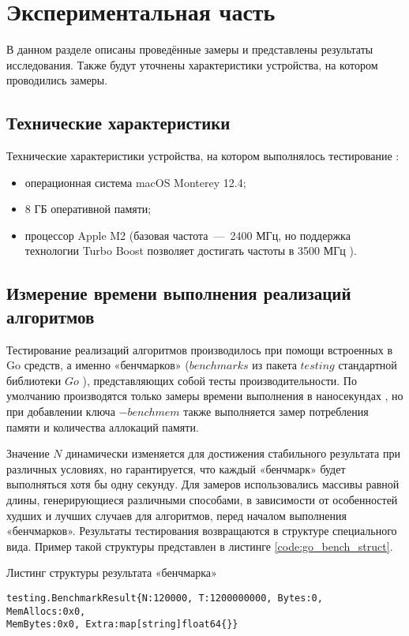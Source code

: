 \chapter{Экспериментальная часть}

В данном разделе описаны проведённые замеры и представлены результаты исследования. Также будут уточнены характеристики устройства, на котором проводились замеры.

\section{Технические характеристики}
Технические характеристики устройства, на котором выполнялось тестирование \cite{web_item5}:
\begin{itemize}
	\item операционная система macOS Monterey 12.4;
	\item 8 ГБ оперативной памяти;
	\item процессор Apple M2 (базовая частота~---~2400 МГц, но поддержка технологии Turbo Boost позволяет достигать частоты в 3500 МГц \cite{web_item10}).
\end{itemize}

\section{Измерение времени выполнения реализаций алгоритмов}
Тестирование реализаций алгоритмов производилось при помощи встроенных в Go средств, а именно «бенчмарков» ($benchmarks$ из пакета $testing$ стандартной библиотеки $Go$ \cite{web_item3}), представляющих собой тесты производительности. По умолчанию производятся только замеры времени выполнения в наносекундах \cite{web_item11}\cite{web_item12}, но при добавлении ключа $-benchmem$ также выполняется замер потребления памяти и количества аллокаций памяти.

Значение $N$ динамически изменяется для достижения стабильного результата при различных условиях, но гарантируется, что каждый «бенчмарк» будет выполняться хотя бы одну секунду. Для замеров использовались массивы равной длины, генерирующиеся  различными способами, в зависимости от особенностей худших и лучших случаев для алгоритмов, перед началом выполнения «бенчмарков». Результаты тестирования возвращаются в структуре специального вида. Пример такой структуры представлен в листинге \ref{code:go_bench_struct}.

\begin{code}
\caption{Листинг структуры результата «бенчмарка»}
\label{code:go_bench_struct}

\begin{verbatim}
testing.BenchmarkResult{N:120000, T:1200000000, Bytes:0, MemAllocs:0x0, 
MemBytes:0x0, Extra:map[string]float64{}}
\end{verbatim}
\end{code}

